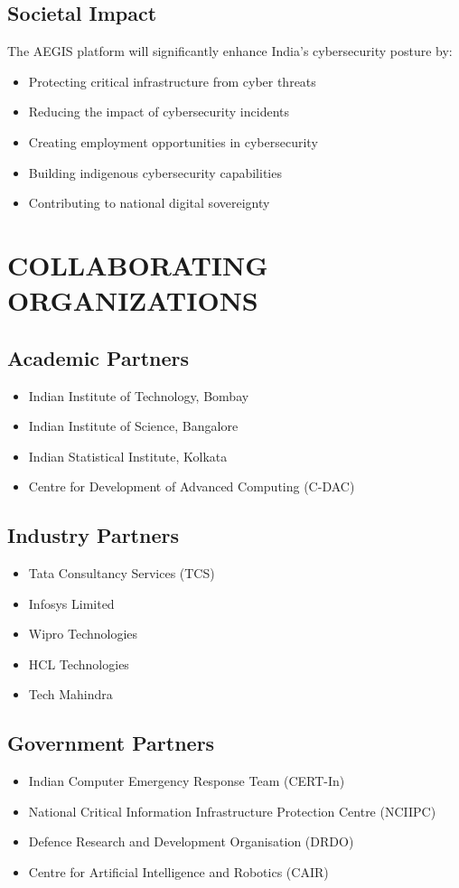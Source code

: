 \documentclass[12pt,a4paper]{article}
\begin{document}
\subsection{Societal Impact}
The AEGIS platform will significantly enhance India's cybersecurity posture by:
\begin{itemize}
\item Protecting critical infrastructure from cyber threats
\item Reducing the impact of cybersecurity incidents
\item Creating employment opportunities in cybersecurity
\item Building indigenous cybersecurity capabilities
\item Contributing to national digital sovereignty
\end{itemize}

\section{COLLABORATING ORGANIZATIONS}

\subsection{Academic Partners}
\begin{itemize}
\item Indian Institute of Technology, Bombay
\item Indian Institute of Science, Bangalore
\item Indian Statistical Institute, Kolkata
\item Centre for Development of Advanced Computing (C-DAC)
\end{itemize}

\subsection{Industry Partners}
\begin{itemize}
\item Tata Consultancy Services (TCS)
\item Infosys Limited
\item Wipro Technologies
\item HCL Technologies
\item Tech Mahindra
\end{itemize}

\subsection{Government Partners}
\begin{itemize}
\item Indian Computer Emergency Response Team (CERT-In)
\item National Critical Information Infrastructure Protection Centre (NCIIPC)
\item Defence Research and Development Organisation (DRDO)
\item Centre for Artificial Intelligence and Robotics (CAIR)
\end{itemize}
\end{document}
